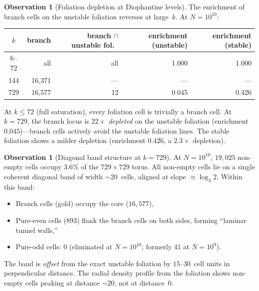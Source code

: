 \documentclass[11pt,a4paper]{article}
\theoremstyle{plain}
\theoremstyle{definition}
\newtheorem{observation}[theorem]{Observation}
\begin{document}
\begin{observation}[Foliation depletion at Diophantine levels]
\label{obs:foliation-depletion}
    The enrichment of branch cells on the unstable foliation reverses
    at large~$k$.  At $N = 10^{10}$:
    \begin{center}
    \begin{tabular}{crrrr}
    \toprule
    $k$ & branch & branch $\cap$ unstable fol.\ & enrichment (unstable) & enrichment (stable) \\
    \midrule
    6--72  & all     & all   & 1.000  & 1.000 \\
    144    & 16{,}371 & ---   & ---    & --- \\
    729    & 16{,}577 & 12    & 0.045  & 0.426 \\
    \bottomrule
    \end{tabular}
    \end{center}
    At $k \leq 72$ (full saturation), every foliation cell is
    trivially a branch cell.  At $k = 729$, the branch locus is
    $22\times$ \emph{depleted} on the unstable foliation (enrichment
    $0.045$)---branch cells actively avoid the unstable foliation lines.
    The stable foliation shows a milder depletion (enrichment $0.426$,
    a $2.3\times$ depletion).
\end{observation}

\begin{observation}[Diagonal band structure at $k = 729$]
\label{obs:diagonal-band}
    At $N = 10^{10}$, $19{,}025$ non-empty cells occupy $3.6\%$ of the
    $729 \times 729$ torus.  All non-empty cells lie on a single
    coherent diagonal band of width ${\sim}20$~cells, aligned at slope
    $\approx \log_3 2$.  Within this band:
    \begin{itemize}
        \item Branch cells (gold) occupy the core ($16{,}577$),
        \item Pure-even cells ($893$) flank the branch cells on both
              sides, forming ``laminar tunnel walls,''
        \item Pure-odd cells: $0$ (eliminated at $N = 10^{10}$;
              formerly $41$ at $N = 10^9$).
    \end{itemize}
    The band is \emph{offset} from the exact unstable foliation by
    $15$--$30$~cell units in perpendicular distance.  The radial
    density profile from the foliation shows non-empty cells peaking
    at distance ${\sim}20$, not at distance~$0$.
\end{observation}
\end{document}
